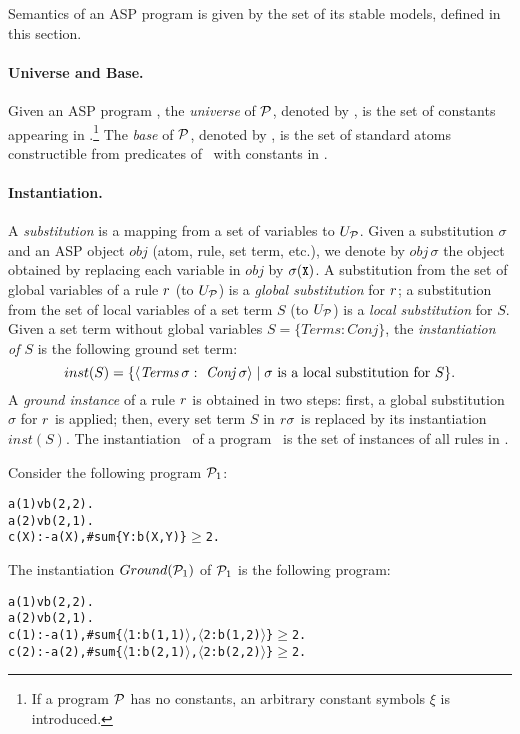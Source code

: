 \documentclass{tlp}
\begin{document}
Semantics of an ASP program is given by the set of its stable models, defined in this section.


\paragraph{Universe and Base.}
Given an ASP program \p, the {\em universe} of ${\cal P}$, denoted by \UP, is the set of constants appearing in \p.\footnote{If a program ${\cal P}$ has no constants, an arbitrary constant symbols $\xi$ is introduced.
}
The {\em base} of ${\cal P}$, denoted by \BP, is the set of standard atoms constructible from predicates of \p\ with constants in \UP.


\paragraph{Instantiation.}
A {\em substitution} is a mapping from a set of variables to $U_{{\cal P}}$.
Given a substitution $\sigma$ and an ASP object $obj$  (atom, rule, set term, etc.), we denote by $obj\,\sigma$ the object obtained by replacing each variable  in $obj$ by $\sigma({\small\texttt{X}})$.
A substitution from the set of global variables of a rule $r$ (to $U_{{\cal P}}$) is a {\em global substitution} for $r$;
a substitution from the set of local variables of a set term $S$ (to $U_{{\cal P}}$) is a {\em local substitution} for $S$.
Given a set term without global variables $S = \{\mathit{Terms}\! :\! \mathit{Conj}\}$, the \emph{instantiation of $S$} is the following ground set term:
$$inst(S) = \{ \langle\mathit{Terms}\,\sigma:\ \mathit{Conj}\,\sigma\rangle \mid \sigma \mbox{ is a local substitution for } S\}.$$
A {\em ground instance} of a rule $r$ is obtained in two steps:
first, a global substitution $\sigma$ for $r$ is applied;
then, every set term $S$ in $r\sigma$ is replaced by its instantiation $inst(S)$.
The instantiation \GP\ of a program \p\ is the set of instances of all rules in \p.

\begin{example}\label{ex:instantiation}
Consider the following program ${\cal P}_1$:
\begin{alltt}\small
 a(1) v b(2,2).
 a(2) v b(2,1).
 c(X) :- a(X), #sum\{Y: b(X,Y)\} \(\geq\) 2.
\end{alltt}\normalsize
The instantiation $Ground({\cal P}_1)$ of ${\cal P}_1$ is the following program:
\begin{alltt}\small
 a(1) v b(2,2).
 a(2) v b(2,1).
 c(1) :- a(1), #sum\{\(\langle\)1: b(1,1)\(\rangle\), \(\langle\)2: b(1,2)\(\rangle\)\} \(\geq\) 2.
 c(2) :- a(2), #sum\{\(\langle\)1: b(2,1)\(\rangle\), \(\langle\)2: b(2,2)\(\rangle\)\} \(\geq\) 2. \punto
\end{alltt}\normalsize
\end{example}
\end{document}
